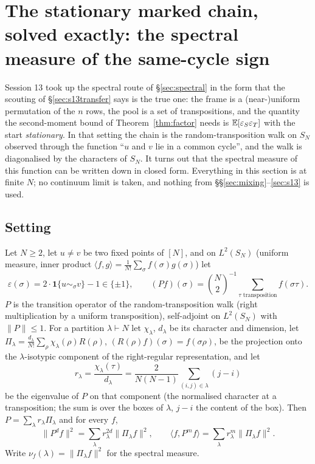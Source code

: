\section{The stationary marked chain, solved exactly: the spectral
measure of the same-cycle sign}\label{sec:spectralexact}

Session 13 took up the spectral route of \S\ref{sec:spectral} in the
form that the scouting of \S\ref{sec:s13transfer} says is the true
one: the frame is a (near-)uniform permutation of the $n$ rows, the
pool is a set of transpositions, and the quantity the second-moment
bound of Theorem~\ref{thm:factor} needs is
$\mathbb{E}[\varepsilon_S\varepsilon_T]$ with the start \emph{stationary}.
In that setting the chain is the random-transposition walk on $S_N$
observed through the function ``$u$ and $v$ lie in a common cycle'',
and the walk is diagonalised by the characters of $S_N$.  It turns out
that the spectral measure of this function can be written down in
closed form.  Everything in this section is at finite $N$; no
continuum limit is taken, and nothing from
\S\S\ref{sec:mixing}--\ref{sec:s13} is used.

\subsection{Setting}

Let $N\ge2$, let $u\ne v$ be two fixed points of $[N]$, and on
$L^2(S_N)$ (uniform measure, inner product
$\langle f,g\rangle=\frac1{N!}\sum_\sigma f(\sigma)g(\sigma)$) let
\[
\varepsilon(\sigma)=2\cdot\mathbf 1\{u\sim_\sigma v\}-1\in\{\pm1\},
\qquad
(Pf)(\sigma)=\binom N2^{-1}\sum_{\tau\text{ transposition}}f(\sigma\tau).
\]
$P$ is the transition operator of the random-transposition walk
(right multiplication by a uniform transposition), self-adjoint on
$L^2(S_N)$ with $\|P\|\le1$.  For a partition $\lambda\vdash N$ let
$\chi_\lambda$, $d_\lambda$ be its character and dimension, let
$\Pi_\lambda=\frac{d_\lambda}{N!}\sum_\rho\chi_\lambda(\rho)R(\rho)$,
$(R(\rho)f)(\sigma)=f(\sigma\rho)$, be the projection onto the
$\lambda$-isotypic component of the right-regular representation, and
let
\[
r_\lambda=\frac{\chi_\lambda(\tau)}{d_\lambda}
=\frac{2}{N(N-1)}\sum_{(i,j)\in\lambda}(j-i)
\]
be the eigenvalue of $P$ on that component (the normalised character
at a transposition; the sum is over the boxes of $\lambda$, $j-i$ the
content of the box).  Then $P=\sum_\lambda r_\lambda\Pi_\lambda$ and
for every $f$,
\[
\|P^df\|^2=\sum_\lambda r_\lambda^{2d}\|\Pi_\lambda f\|^2,
\qquad
\langle f,P^mf\rangle=\sum_\lambda r_\lambda^{m}\|\Pi_\lambda f\|^2 .
\]
Write $\nu_f(\lambda)=\|\Pi_\lambda f\|^2$ for the spectral measure.

